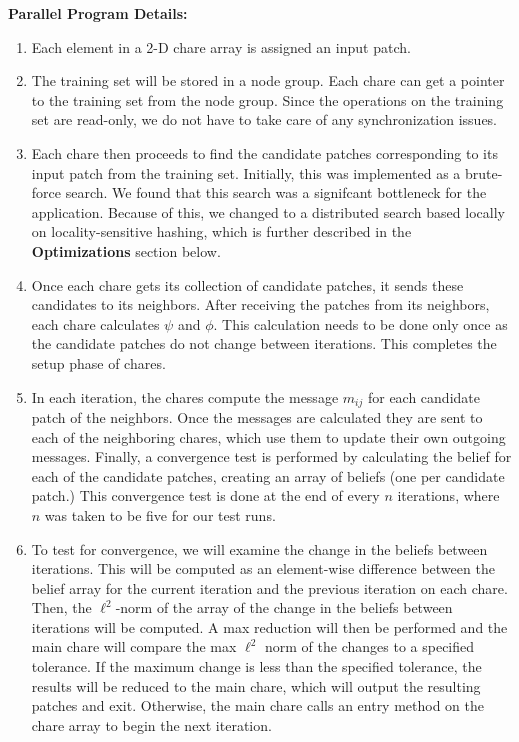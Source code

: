 \documentclass[a4paper]{article}
\begin{document}
\textbf{Parallel Program Details:}
\begin{enumerate}
\item Each element in a 2-D chare array is assigned an input patch.
\item The training set will be stored in a node group. Each chare can get a pointer to the training set from the node group. Since the operations on the training set are read-only, we do not have to take care of any synchronization issues.
\item Each chare then proceeds to find the candidate patches corresponding to its input patch from the training set. Initially, this was implemented as a brute-force search. We found that this search was a signifcant bottleneck for the application. Because of this, we changed to a distributed search based locally on locality-sensitive hashing, which is further described in the \textbf{Optimizations} section below.
\item Once each chare gets its collection of candidate patches, it sends these candidates to its neighbors. After receiving the patches from its neighbors, each chare calculates $\psi$ and $\phi$. This calculation needs to be done only once as the candidate patches do not change between iterations. This completes the setup phase of chares.
\item In each iteration, the chares compute the message $m_{ij}$ for each candidate patch of the neighbors. Once the messages are calculated they are sent to each of the neighboring chares, which use them to update their own outgoing messages. Finally, a convergence test is performed by calculating the belief for each of the candidate patches, creating an array of beliefs (one per candidate patch.) This convergence test is done at the end of every $n$ iterations, where $n$ was taken to be five for our test runs.
\item To test for convergence, we will examine the change in the beliefs between iterations. This will be computed as an element-wise difference between the belief array for the current iteration and the previous iteration on each chare. Then, the $\ell^2$-norm of the array of the change in the beliefs between iterations will be computed. A max reduction will then be performed and the main chare will compare the max $\ell^2$ norm of the changes to a specified tolerance. If the maximum change is less than the specified tolerance, the results will be reduced to the main chare, which will output the resulting patches and exit. Otherwise, the main chare calls an entry method on the chare array to begin the next iteration.
\end{enumerate}
\end{document}

